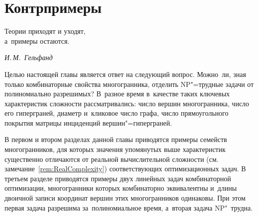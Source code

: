 
%
%

\chapter{Контрпримеры}
\label{chap:Counterexamples}

\begin{flushright}
\begin{minipage}{0.4\textwidth}
Теории приходят и уходят,\\ а~примеры остаются.
\begin{flushright}
\emph{И.\,М.~Гельфанд}
\end{flushright}
\end{minipage}
\end{flushright}
\bigskip


Целью настоящей главы является ответ на следующий вопрос.
Можно~ли, зная только комбинаторные свойства 
многогранника, отделить NP"=трудные задачи от полиномиально разрешимых?
В~разное время в~качестве таких ключевых характеристик сложности рассматривались: число вершин многогранника, число его гиперграней, диаметр и~кликовое число графа, число прямоугольного покрытия матрицы инциденций вершин"=гиперграней.

В первом и втором разделах данной главы приводятся примеры семейств многогранников,
для которых значения упомянутых выше характеристик существенно отличаются от реальной вычислительной сложности (см. замечание~\ref{rem:RealComplexity}) соответствующих оптимизационных задач.
В третьем разделе приводятся примеры двух линейных задач комбинаторной оптимизации, 
многогранники которых комбинаторно эквивалентны 
и~длины двоичной записи координат вершин этих многогранников одинаковы. 
При этом первая задача разрешима за~полиномиальное время, 
а~вторая задача NP"~трудна.

